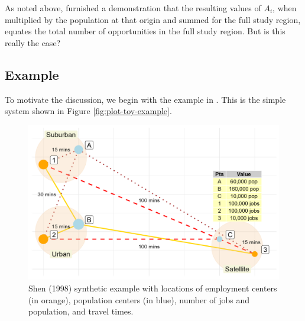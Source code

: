 \documentclass[]{elsarticle} %
\begin{document}
As noted above, \citet{shen1998} furnished a demonstration that the
resulting values of \(A_i\), when multiplied by the population at that
origin and summed for the full study region, equates the total number of
opportunities in the full study region. But is this really the case?

\hypertarget{example}{%
\subsection{Example}\label{example}}

To motivate the discussion, we begin with the example in
\citet{shen1998}. This is the simple system shown in Figure
\ref{fig:plot-toy-example}.

\begin{figure}

{\centering \includegraphics[width=1\linewidth]{images/plot-toy-example} 

}

\caption{\label{fig:plot-toy-example} Shen (1998) synthetic example with locations of employment centers (in orange), population centers (in blue), number of jobs and population, and travel times.}\label{fig:create-figure-with-toy-example3}
\end{figure}

 
  \providecommand{\huxb}[2]{\arrayrulecolor[RGB]{#1}\global\arrayrulewidth=#2pt}
  \providecommand{\huxvb}[2]{\color[RGB]{#1}\vrule width #2pt}
  \providecommand{\huxtpad}[1]{\rule{0pt}{#1}}
  \providecommand{\huxbpad}[1]{\rule[-#1]{0pt}{#1}}
\end{document}
